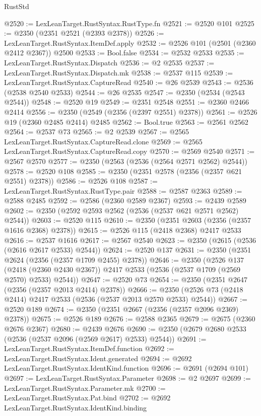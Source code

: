 \begin{lexlean}{RustStd}
\begin{coremodule}
@2520 := LexLeanTarget.RustSyntax.RustType.fn
@2521 := @2520 @101
@2525 := @2350 (@2351 @2521 (@2393 @2378))
@2526 := LexLeanTarget.RustSyntax.ItemDef.apply
@2532 := @2526 @101 (@2501 (@2360 @2412 @2367)) @2500
@2533 := Bool.false
@2534 := @2532 @2533
@2535 := LexLeanTarget.RustSyntax.Dispatch
@2536 := @2 @2535
@2537 := LexLeanTarget.RustSyntax.Dispatch.mk
@2538 := @2537 @115
@2539 := LexLeanTarget.RustSyntax.CaptureRead
@2540 := @26 @2539
@2543 := @2536 (@2538 @2540 @2533)
@2544 := @26 @2535
@2547 := @2350 (@2534 (@2543 @2544))
@2548 := @2520 @19
@2549 := @2351 @2548
@2551 := @2360 @2466 @2414
@2556 := @2350 (@2549 (@2356 (@2397 @2551) @2378))
@2561 := @2526 @19 (@2360 @2485 @2414) @2485
@2562 := Bool.true
@2563 := @2561 @2562
@2564 := @2537 @73
@2565 := @2 @2539
@2567 := @2565 LexLeanTarget.RustSyntax.CaptureRead.clone
@2569 := @2565 LexLeanTarget.RustSyntax.CaptureRead.copy
@2570 := @2569 @2540
@2571 := @2567 @2570
@2577 := @2350 (@2563 (@2536 (@2564 @2571 @2562) @2544))
@2578 := @2520 @108
@2585 := @2350 (@2351 @2578 (@2356 (@2357 @621 @2551) @2378))
@2586 := @2526 @108
@2587 := LexLeanTarget.RustSyntax.RustType.pair
@2588 := @2587 @2363
@2589 := @2588 @2485
@2592 := @2586 (@2360 @2589 @2367)
@2593 := @2439 @2589
@2602 := @2350 (@2592 @2593 @2562 (@2536 (@2537 @621 @2571 @2562) @2544))
@2603 := @2520 @115
@2610 := @2350 (@2351 @2603 (@2356 (@2357 @1616 @2368) @2378))
@2615 := @2526 @115 (@2418 @2368) @2417 @2533
@2616 := @2537 @1616
@2617 := @2567 @2540
@2623 := @2350 (@2615 (@2536 (@2616 @2617 @2533) @2544))
@2624 := @2520 @137
@2631 := @2350 (@2351 @2624 (@2356 (@2357 @1709 @2455) @2378))
@2646 := @2350
    (@2526
      @137
      (@2418 (@2360 @2430 @2367))
      @2417
      @2533
      (@2536 (@2537 @1709 (@2569 @2570) @2533) @2544))
@2647 := @2520 @73
@2654 := @2350 (@2351 @2647 (@2356 (@2357 @2013 @2414) @2378))
@2666 := @2350 (@2526 @73 (@2418 @2414) @2417 @2533 (@2536 (@2537 @2013 @2570 @2533) @2544))
@2667 := @2520 @189
@2674 := @2350 (@2351 @2667 (@2356 (@2357 @2096 @2369) @2378))
@2675 := @2526 @189
@2676 := @2588 @2365
@2679 := @2675 (@2360 @2676 @2367)
@2680 := @2439 @2676
@2690 := @2350 (@2679 @2680 @2533 (@2536 (@2537 @2096 (@2569 @2617) @2533) @2544))
@2691 := LexLeanTarget.RustSyntax.ItemDef.function
@2692 := LexLeanTarget.RustSyntax.Ident.generated
@2694 := @2692 LexLeanTarget.RustSyntax.IdentKind.function
@2696 := @2691 (@2694 @101)
@2697 := LexLeanTarget.RustSyntax.Parameter
@2698 := @2 @2697
@2699 := LexLeanTarget.RustSyntax.Parameter.mk
@2700 := LexLeanTarget.RustSyntax.Pat.bind
@2702 := @2692 LexLeanTarget.RustSyntax.IdentKind.binding

\end{coremodule}
\end{lexlean}
